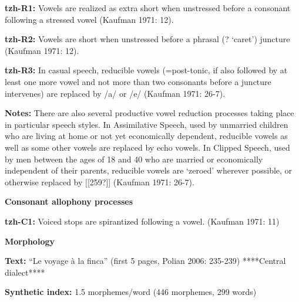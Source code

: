 \begin{styleBody}
\textbf{tzh-R1:} Vowels are realized as extra short when unstressed before a consonant following a stressed vowel (Kaufman 1971: 12).
\end{styleBody}

\begin{styleBody}
\textbf{tzh-R2:} Vowels are short when unstressed before a phrasal (? ‘caret’) juncture (Kaufman 1971: 12).
\end{styleBody}

\begin{styleBody}
\textbf{tzh-R3:} In casual speech, reducible vowels (=post-tonic, if also followed by at least one more vowel and not more than two consonants before a juncture intervenes) are replaced by /a/ or /e/ (Kaufman 1971: 26-7).
\end{styleBody}

\begin{styleBody}
\textbf{Notes: }There are also several productive vowel reduction processes taking place in particular speech styles. In Assimilative Speech, used by unmarried children who are living at home or not yet economically dependent, reducible vowels as well as some other vowels are replaced by echo vowels. In Clipped Speech, used by men between the ages of 18 and 40 who are married or economically independent of their parents, reducible vowels are ‘zeroed’ wherever possible, or otherwise replaced by [[259?]] (Kaufman 1971: 26-7).
\end{styleBody}

\begin{styleBody}
\textbf{Consonant allophony processes}
\end{styleBody}

\begin{styleBody}
\textbf{tzh-C1: }Voiced stops are spirantized following a vowel. (Kaufman 1971: 11)
\end{styleBody}

\begin{styleBody}
\textbf{Morphology}
\end{styleBody}

\begin{styleBody}
\textbf{Text:} “Le voyage à la finca” (first 5 pages, Polian 2006: 235-239) ****Central dialect****
\end{styleBody}

\begin{styleBody}
\textbf{Synthetic index: }1.5 morphemes/word (446 morphemes, 299 words)
\end{styleBody}

